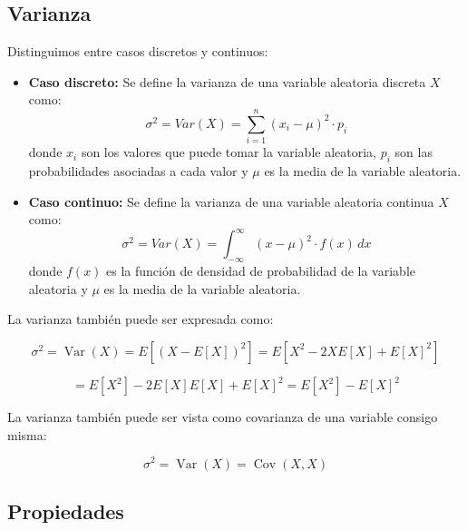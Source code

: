 \subsection*{Varianza}

\begin{definición}[Varianza]
Distinguimos entre casos discretos y continuos:
\begin{itemize}
    \item \textbf{Caso discreto: } Se define la varianza de una variable aleatoria discreta $X$ como:
          \begin{equation}
              \sigma^2 = Var(X) = \sum_{i=1}^{n} (x_i - \mu)^2 \cdot p_i
          \end{equation}
          donde $x_i$ son los valores que puede tomar la variable aleatoria, $p_i$ son las probabilidades asociadas a cada valor y $\mu$ es la media de la variable aleatoria.
    \item \textbf{Caso continuo: } Se define la varianza de una variable aleatoria continua $X$ como:
          \begin{equation}
              \sigma^2 = Var(X) = \int_{-\infty}^{\infty} (x - \mu)^2 \cdot f(x) \, dx
          \end{equation}
          donde $f(x)$ es la función de densidad de probabilidad de la variable aleatoria y $\mu$ es la media de la variable aleatoria.
\end{itemize}
\end{definición}

La varianza también puede ser expresada como:

\begin{equation}
    \sigma^2 = \operatorname{Var}(X) = E[(X - E[X])^2]
    = E[X^2 - 2XE[X] + E[X]^2]
\end{equation}

\begin{equation}
    = E[X^2] - 2E[X] E[X] + E[X]^2
    = E[X^2] - E[X]^2
\end{equation}

La varianza también puede ser vista como covarianza de una variable consigo
misma:

\begin{equation}
    \sigma^2 = \operatorname{Var}(X) = \operatorname{Cov}(X, X)
\end{equation}

\subsection*{Propiedades}

